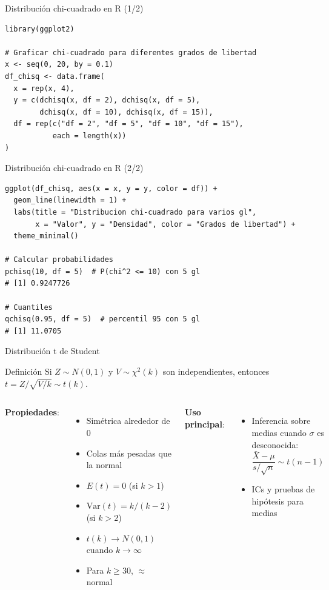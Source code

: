 \documentclass[aspectratio=169, 11pt]{beamer}
\begin{document}
\begin{frame}[fragile]{Distribución chi-cuadrado en R (1/2)}
\begin{lstlisting}
library(ggplot2)

# Graficar chi-cuadrado para diferentes grados de libertad
x <- seq(0, 20, by = 0.1)
df_chisq <- data.frame(
  x = rep(x, 4),
  y = c(dchisq(x, df = 2), dchisq(x, df = 5),
        dchisq(x, df = 10), dchisq(x, df = 15)),
  df = rep(c("df = 2", "df = 5", "df = 10", "df = 15"),
           each = length(x))
)
\end{lstlisting}
\end{frame}

\begin{frame}[fragile]{Distribución chi-cuadrado en R (2/2)}
\begin{lstlisting}
ggplot(df_chisq, aes(x = x, y = y, color = df)) +
  geom_line(linewidth = 1) +
  labs(title = "Distribucion chi-cuadrado para varios gl",
       x = "Valor", y = "Densidad", color = "Grados de libertad") +
  theme_minimal()

# Calcular probabilidades
pchisq(10, df = 5)  # P(chi^2 <= 10) con 5 gl
# [1] 0.9247726

# Cuantiles
qchisq(0.95, df = 5)  # percentil 95 con 5 gl
# [1] 11.0705
\end{lstlisting}
\end{frame}

\begin{frame}{Distribución t de Student}
\begin{block}{Definición}
Si $Z \sim N(0,1)$ y $V \sim \chi^2(k)$ son independientes, entonces
$t = Z/\sqrt{V/k} \sim t(k)$.
\end{block}

\begin{columns}[T]
\textbf{Propiedades}:
\begin{itemize}
\item Simétrica alrededor de 0
\item Colas más pesadas que la normal
\item $E(t) = 0$ (si $k > 1$)
\item $\text{Var}(t) = k/(k-2)$ (si $k > 2$)
\item $t(k) \to N(0,1)$ cuando $k \to \infty$
\item Para $k \geq 30$, $\approx$ normal
\end{itemize}

\textbf{Uso principal}:
\begin{itemize}
\item Inferencia sobre medias cuando $\sigma$ es desconocida:
\[
\frac{\bar{X} - \mu}{s/\sqrt{n}} \sim t(n-1)
\]
\item ICs y pruebas de hipótesis para medias
\end{itemize}
\end{columns}
\end{frame}
\end{document}
